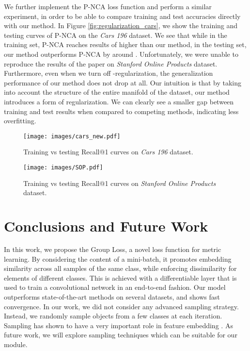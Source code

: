 \documentclass[runningheads]{llncs}
\begin{document}
We further implement the P-NCA \cite{DBLP:conf/iccv/Movshovitz-Attias17} loss function and perform a similar experiment, in order to be able to compare training and test accuracies directly with our method. In Figure \ref{fig:regularization_cars}, we show the training and testing curves of P-NCA on the \textit{Cars 196} \cite{KrauseStarkDengFei-Fei_3DRR2013} dataset. We see that while in the training set, P-NCA reaches results of  higher than our method, in the testing set, our method outperforms P-NCA by around . Unfortunately, we were unable to reproduce the results of the paper \cite{DBLP:conf/iccv/Movshovitz-Attias17} on \textit{Stanford Online Products} dataset. Furthermore, even when we turn off -regularization, the generalization performance of our method does not drop at all.
Our intuition is that by taking into account the structure of the entire manifold of the dataset, our method introduces a form of regularization.
We can clearly see a smaller gap between training and test results when compared to competing methods, indicating less overfitting.


\begin{figure*}[t]
\centering
\begin{minipage}[t]{.49\textwidth}
  \centering
\texttt{[image: images/cars\_new.pdf]} \caption{Training vs testing Recall@1 curves on \textit{Cars 196} dataset.}
  \label{fig:regularization_cars}
\end{minipage}
\hfill \begin{minipage}[t]{.49\textwidth}
  \centering
\texttt{[image: images/SOP.pdf]} \caption{Training vs testing Recall@1 curves on \textit{Stanford Online Products} dataset.}
  \label{fig:regularization_sop}
\end{minipage}
\hfill \end{figure*} 
\section{Conclusions and Future Work}

In this work, we propose the Group Loss, a novel loss function for metric learning. By considering the content of a mini-batch, it promotes embedding similarity across all samples of
the same class, while enforcing dissimilarity for elements of different classes. 
This is achieved with a differentiable layer that is used to train a convolutional network in an end-to-end fashion.
Our model outperforms state-of-the-art methods on several datasets, and shows fast convergence.
In our work, we did not consider any advanced sampling strategy. Instead, we randomly sample objects from a few classes at each iteration. Sampling has shown to have a very important role in feature embedding \cite{DBLP:conf/iccv/ManmathaWSK17}. As future work, we will explore sampling techniques which can be suitable for our module. 
\end{document}
